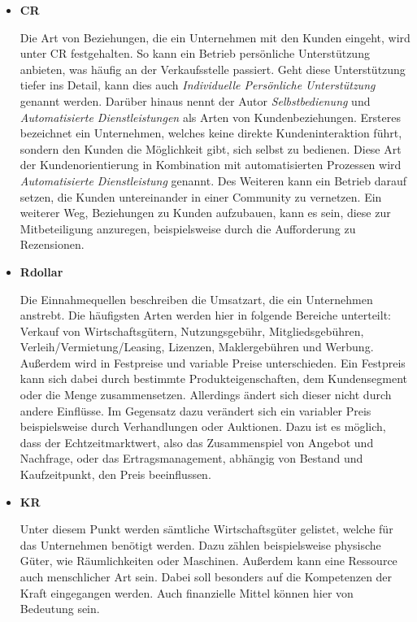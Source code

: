 \begin{itemize}
	\item \textbf{\ac{CR}}
	
	Die Art von Beziehungen, die ein Unternehmen mit den Kunden eingeht, wird unter \acs{CR} festgehalten. So kann ein Betrieb persönliche Unterstützung anbieten, was häufig an der Verkaufsstelle passiert. Geht diese Unterstützung tiefer ins Detail, kann dies auch \textit{Individuelle Persönliche Unterstützung} genannt werden. Darüber hinaus nennt der Autor \textit{Selbstbedienung} und \textit{Automatisierte Dienstleistungen} als Arten von Kundenbeziehungen. Ersteres bezeichnet ein Unternehmen, welches keine direkte Kundeninteraktion führt, sondern den Kunden die Möglichkeit gibt, sich selbst zu bedienen. Diese Art der Kundenorientierung in Kombination mit automatisierten Prozessen wird \textit{Automatisierte Dienstleistung} genannt. Des Weiteren kann ein Betrieb darauf setzen, die Kunden untereinander in einer Community zu vernetzen. Ein weiterer Weg, Beziehungen zu Kunden aufzubauen, kann es sein, diese zur Mitbeteiligung anzuregen, beispielsweise durch die Aufforderung zu Rezensionen.
	
	\item \textbf{\ac{Rdollar}}
	
	Die Einnahmequellen beschreiben die Umsatzart, die ein Unternehmen anstrebt. Die häufigsten Arten werden hier in folgende Bereiche unterteilt: Verkauf von Wirtschaftsgütern, Nutzungsgebühr, Mitgliedsgebühren, Verleih/Vermietung/Leasing, Lizenzen, Maklergebühren und Werbung. Außerdem wird in Festpreise und variable Preise unterschieden. Ein Festpreis kann sich dabei durch bestimmte Produkteigenschaften, dem Kundensegment oder die Menge zusammensetzen. Allerdings ändert sich dieser nicht durch andere Einflüsse. Im Gegensatz dazu verändert sich ein variabler Preis beispielsweise durch Verhandlungen oder Auktionen. Dazu ist es möglich, dass der Echtzeitmarktwert, also das Zusammenspiel von Angebot und Nachfrage, oder das Ertragsmanagement, abhängig von Bestand und Kaufzeitpunkt, den Preis beeinflussen.
	
	
	\item \textbf{\ac{KR}}
	
	Unter diesem Punkt werden sämtliche Wirtschaftsgüter gelistet, welche für das Unternehmen benötigt werden. Dazu zählen beispielsweise physische Güter, wie Räumlichkeiten oder Maschinen. Außerdem kann eine Ressource auch menschlicher Art sein. Dabei soll besonders auf die Kompetenzen der Kraft eingegangen werden. Auch finanzielle Mittel können hier von Bedeutung sein.
	

\end{itemize}
